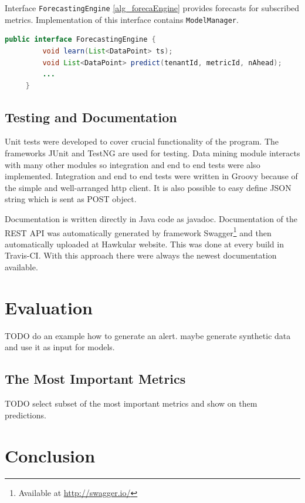     Interface \texttt{ForecastingEngine} \ref{alg_forecaEngine} provides forecasts for
    subscribed metrics. Implementation of this interface contains \texttt{ModelManager}.
    
    \begin{lstlisting}[caption={Interface Forecasting Engine}, language=Java, label={alg_forecaEngine}]
     public interface ForecastingEngine {
         void learn(List<DataPoint> ts);
         void List<DataPoint> predict(tenantId, metricId, nAhead);
         ...
     }
    \end{lstlisting}

    \section{Testing and Documentation}
    Unit tests were developed to cover crucial functionality of the program. The
    frameworks JUnit and TestNG are used for testing. Data mining module interacts with many other modules so
    integration and end to end tests were also implemented. Integration and end to end
    tests were written in Groovy because of the simple and well-arranged http client. It
    is also possible to easy define JSON string which is sent as POST object.

    Documentation is written directly in Java code as javadoc. Documentation of the REST
    API was automatically generated by framework Swagger\footnote{Available at
    \url{http://swagger.io/}} and then automatically uploaded at Hawkular website. This
    was done at every build in Travis-CI. With this approach there were always the newest 
    documentation available.

\chapter{Evaluation}
TODO do an example how to generate an alert.
maybe generate synthetic data and use it as input for models.

    \section{The Most Important Metrics}
    TODO select subset of the most important metrics and show on them predictions.

\chapter{Conclusion}

